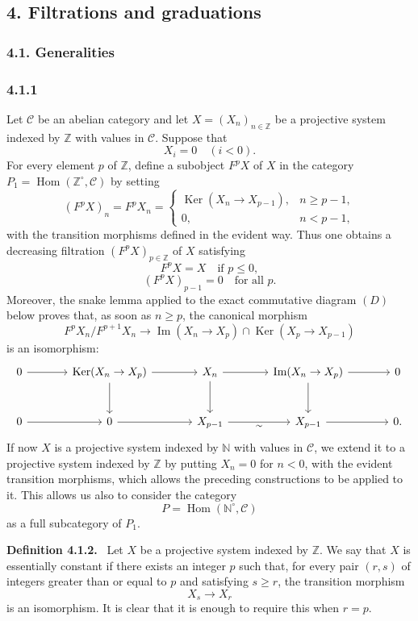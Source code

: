 \documentclass[11pt]{article}
\providecommand{\ZZ}{\mathbb{Z}}
\providecommand{\NN}{\mathbb{N}}
\newenvironment{statement}[1]{\par\medskip\noindent\textbf{#1.}\ }{\par\medskip}
\DeclareMathOperator{\Hom}{Hom}
\providecommand{\Ker}{\operatorname{Ker}}
\providecommand{\Hom}{\operatorname{Hom}}
\providecommand{\NN}{\mathbb N}
\providecommand{\cC}{\mathcal C}
\providecommand{\Im}{\operatorname{Im}}
\providecommand{\Ker}{\operatorname{Ker}}
\renewcommand{\Im}{\operatorname{Im}}
\providecommand{\Ker}{\operatorname{Ker}}
\providecommand{\Im}{\operatorname{Im}}
\providecommand{\cC}{\mathcal C}
\providecommand{\Hom}{\operatorname{Hom}}
\begin{document}
\subsection*{4. Filtrations and graduations}
\subsubsection*{4.1. Generalities}
\subsubsection*{4.1.1}
Let $\cC$ be an abelian category and let $X=(X_n)_{n\in\ZZ}$ be a projective system indexed by $\ZZ$ with values in $\cC$. Suppose that
\[
X_i=0\quad(i<0).
\]
For every element $p$ of $\ZZ$, define a subobject $F^pX$ of $X$ in the category $P_1=\Hom(\ZZ^\circ,\cC)$ by setting
\[
(F^pX)_n=F^pX_n=
\begin{cases}
\Ker(X_n\to X_{p-1}),& n\ge p-1,\\
0,& n<p-1,
\end{cases}
\]
with the transition morphisms defined in the evident way. Thus one obtains a decreasing filtration $(F^pX)_{p\in\ZZ}$ of $X$ satisfying
\[
F^pX=X\quad\text{if }p\le0,
\]
\[
(F^pX)_{p-1}=0\quad\text{for all }p.
\]
Moreover, the snake lemma applied to the exact commutative diagram $(D)$ below proves that, as soon as $n\ge p$, the canonical morphism
\[
F^pX_n/F^{p+1}X_n\longrightarrow \Im(X_n\to X_p)\cap\Ker(X_p\to X_{p-1})
\]
is an isomorphism:
\[
\begin{tikzcd}[column sep=large,row sep=large]
0 \arrow[r] & \Ker(X_n\to X_p) \arrow[r] \arrow[d] & X_n \arrow[r] \arrow[d] & \Im(X_n\to X_p) \arrow[r] \arrow[d] & 0\\
0 \arrow[r] & 0 \arrow[r] & X_{p-1} \arrow[r,"\sim"'] & X_{p-1} \arrow[r] & 0 .
\end{tikzcd}
\]
If now $X$ is a projective system indexed by $\NN$ with values in $\cC$, we extend it to a projective system indexed by $\ZZ$ by putting $X_n=0$ for $n<0$, with the evident transition morphisms, which allows the preceding constructions to be applied to it. This allows us also to consider the category
\[
P=\Hom(\NN^\circ,\cC)
\]
as a full subcategory of $P_1$.

\begin{statement}{Definition 4.1.2}
Let $X$ be a projective system indexed by $\ZZ$. We say that $X$ is essentially constant if there exists an integer $p$ such that, for every pair $(r,s)$ of integers greater than or equal to $p$ and satisfying $s\ge r$, the transition morphism
\[
X_s\longrightarrow X_r
\]
is an isomorphism. It is clear that it is enough to require this when $r=p$.
\end{statement}
\end{document}
